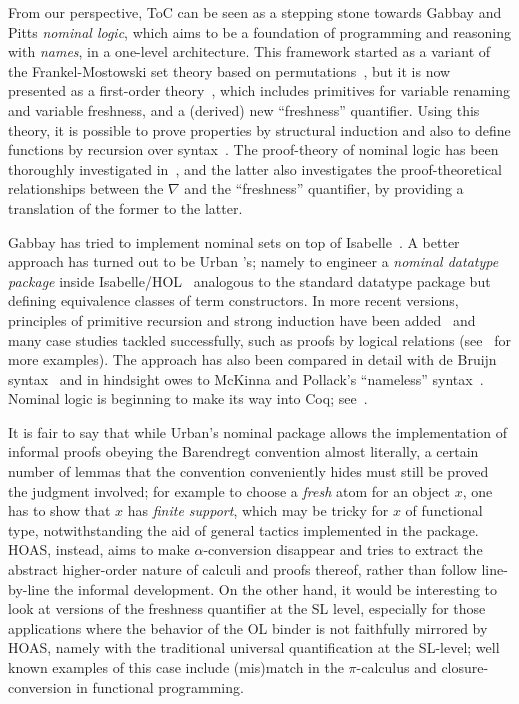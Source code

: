\documentclass[final]{svjour3}
\begin{document}
From our perspective, ToC can be seen as a stepping stone towards 
Gabbay and Pitts \emph{nominal logic}, which aims to be a foundation of
programming and reasoning with \emph{names}, in a one-level
architecture.  This framework started as a variant of the
Frankel-Mostowski set theory based on
permutations~\cite{PittsAM:newaas-jv}, but  it is now presented as a
first-order theory~\cite{pitts03ic}, which includes primitives for
variable renaming and variable freshness, and a (derived) new
``freshness'' quantifier.  Using this theory, it is possible to prove
properties by structural induction and also to define functions by
recursion over syntax~\cite{Pitts06}.  The proof-theory of nominal
logic has been thoroughly investigated in~\cite{GabbayC04,Cheney05},
and the latter  also investigates the proof-theoretical
relationships between the $\nabla$ and the ``freshness'' quantifier, by
providing a translation of the former to the latter.

Gabbay has tried
to implement nominal sets on top of Isabelle~\cite{GabbayMJ02tphol}.  A
better approach has turned out
to be Urban \etal's; namely to engineer a \emph{nominal datatype
  package} inside Isabelle/HOL~\cite{urban05cade,Nominal} analogous to the
standard datatype package but defining equivalence classes of term
constructors. In more recent versions, principles of primitive
recursion and strong induction have been added~\cite{UrbanB06} and
many case studies tackled successfully, such as proofs by logical
relations
(see~\cite{Nominal} for more
examples).  The approach has also been compared in detail with de Bruijn
syntax~\cite{BerghoferU07} and in hindsight owes to McKinna and
Pollack's ``nameless'' syntax~\cite{McKinna99}. Nominal logic is
beginning to make its way into Coq; see~\cite{Aydemir07}.

It is fair to say that while Urban's nominal package allows the
implementation of informal proofs obeying the Barendregt convention almost
literally, a certain number of lemmas that the convention
conveniently hides must still be proved \wrt the judgment involved;
for example to choose a \emph{fresh} atom for an object $x$, one has
to show that $x$ has \emph{finite support}, which may be tricky for
$x$ of functional type, notwithstanding the aid of general tactics
implemented in the package.  HOAS, instead, aims to make
$\alpha$-conversion disappear and tries to extract the
abstract higher-order nature of calculi and proofs thereof, rather
than follow line-by-line the informal development. On the other hand,
it would be interesting to look at versions of the freshness
quantifier at the SL level, especially for those
applications where the behavior of the OL binder is not
faithfully mirrored by HOAS, namely with the traditional universal
quantification at the SL-level; well known examples of this case
include (mis)match in the $\pi$-calculus and closure-conversion in
functional programming.
\end{document}
